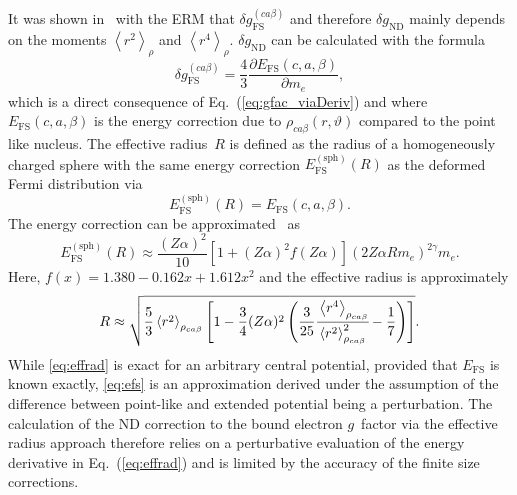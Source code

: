 It was shown in~\cite{jacek2012} with the ERM \cite{Shabaev1993} that $\delta g_{\text{FS}}^{(ca\beta)}$ and therefore $\delta g_{\text{ND}}$ mainly depends on the moments $\left< r^2 \right>_{\rho}$ and $\left< r^4 \right>_{\rho}$. $\delta g_{\text{ND}}$ can be calculated with the formula~\cite{Karshenboim2005}
\begin{equation}
\delta g^{(ca\beta)}_{\text{FS}}=\frac{4}{3}\frac{\partial E_{\text{FS}}(c,a,\beta)}{\partial m_e},
\label{eq:effrad}
\end{equation}
which is a direct consequence of Eq.~(\ref{eq:gfac_viaDeriv}) and where $E_{\text{FS}}(c,a,\beta)$ is the energy correction due to $\rho_{ca\beta}(r,\vartheta)$ compared to the point like nucleus.
The effective radius~$R$ is defined as the radius of a homogeneously charged sphere with the same energy correction $E^{(\text{sph})}_{\text{FS}}(R)$ as the deformed Fermi distribution via
\begin{equation}
E^{(\text{sph})}_{\text{FS}}(R) = E_{\text{FS}}(c,a,\beta).
\label{eq:effradNum}
\end{equation}
The energy correction can be approximated~\cite{Shabaev1993} as
\begin{equation}
E^{(\text{sph})}_{\text{FS}}(R)\approx\frac{(Z\alpha)^2}{10}\left[{1}{+}(Z\alpha)^2f(Z\alpha) \right](2Z\alpha R m_e)^{2\gamma}m_e.
\label{eq:efs}
\end{equation}
Here, $f(x)=1.380-0.162x+1.612x^2$ and the effective radius is approximately
\small
\begin{equation}
R\approx\sqrt{\frac{5}{3}\left<r^2\right>_{\rho_{ca\beta}}\left[ 1-\frac{3}{4}(Z\alpha)^2 \left( \frac{3}{25}\cfrac{\left<r^4\right>_{\rho_{ca\beta}}}{\left<r^2\right>^2_{\rho_{ca\beta}}}-\frac{1}{7} \right) \right]}.
\label{eq:radius}
\end{equation}
\normalsize
While \eqref{eq:effrad} is exact for an arbitrary central potential, provided that $E_{\text{FS}}$ is known exactly, \eqref{eq:efs} is an approximation derived under the assumption of the difference between point-like and extended potential being a perturbation. The calculation of the ND correction to the bound electron $g$~factor via the effective radius approach therefore relies on a perturbative evaluation of the energy derivative in Eq.~(\ref{eq:effrad}) and is limited by the accuracy of the finite size corrections.

